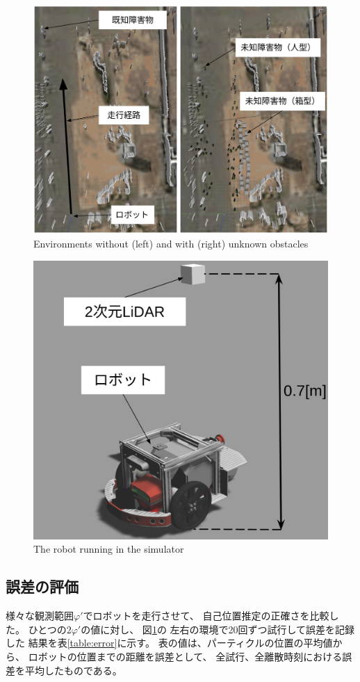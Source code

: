 \documentclass{jarticle}
\begin{document}
\begin{figure}[htbp]
  \centering
   \includegraphics[width=1.0\linewidth]{fig/environment_comparison.png}
	\caption{Environments without (left) and with (right) unknown obstacles}
   \label{fig:つくばチャレンジ人混みシミュレータ}
\end{figure}

\begin{figure}[htbp]
  \centering
   \includegraphics[width=0.5\linewidth]{fig/raspicat_gazebo.png}
   \caption{The robot running in the simulator}
   \label{fig:raspicat}
\end{figure}

\subsection{誤差の評価}


様々な観測範囲$\varphi'$でロボットを走行させて、
自己位置推定の正確さを比較した。
ひとつの$2\varphi'$の値に対し、
図\ref{fig:つくばチャレンジ人混みシミュレータ}の
左右の環境で20回ずつ試行して誤差を記録した
結果を表\ref{table:error}に示す。
表の値は、パーティクルの位置の平均値から、
ロボットの位置までの距離を誤差として、
全試行、全離散時刻における誤差を平均したものである。
\end{document}
